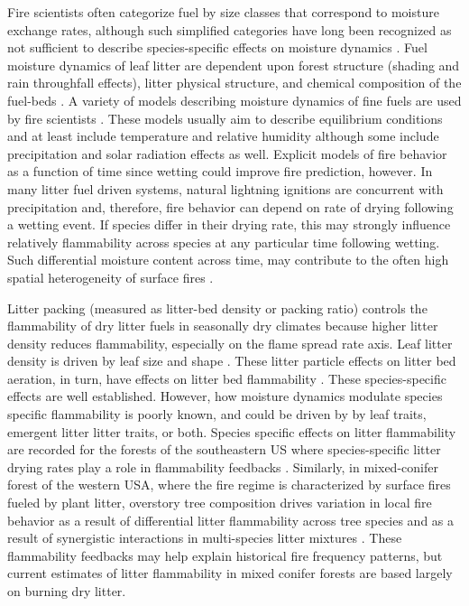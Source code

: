 \documentclass[letterpaper,12pt]{article}
\begin{document}
Fire scientists often categorize fuel by size classes that correspond to
moisture exchange rates, although such simplified categories have long been
recognized as not sufficient to describe species-specific effects on moisture
dynamics \citep{Anderson-1985}. Fuel moisture dynamics of leaf litter are
dependent upon forest structure (shading and rain throughfall effects), litter
physical structure, and chemical composition of the fuel-beds
\citep{Nelson+Hiers-2008, Matthews-2014, Kreye_Hiers_etal-2018}. A variety of
models describing moisture dynamics of fine fuels are used by fire scientists
\citep{Viney-1991, Nelson-2000, Catchpole+Catchpole+etal-2001}. These models
usually aim to describe equilibrium conditions and at least include temperature
and relative humidity although some include precipitation and solar radiation
effects as well. Explicit models of fire behavior as a function of time since
wetting could improve fire prediction, however. In many litter fuel driven
systems, natural lightning ignitions are concurrent with precipitation and,
therefore, fire behavior can depend on rate of drying following a wetting
event. If species differ in their drying rate, this may strongly influence
relatively flammability across species at any particular time following
wetting. Such differential moisture content across time, may contribute to the
often high spatial heterogeneity of surface fires
\citep{Knapp_Schwilk_etal-2006, Kreye_Hiers_etal-2018}.



Litter packing (measured as litter-bed density or packing ratio) controls the
flammability of dry litter fuels in seasonally dry climates because higher
litter density reduces flammability, especially on the flame spread rate axis.
Leaf litter density is driven by leaf size and shape
\citep{Fonda+Belanger+etal-1998, Scarff+Westoby-2006, Kane+Varner+etal-2008}.
These litter particle effects on litter bed aeration, in turn, have effects on
litter bed flammability \citep{Ganteaume+Marielle+etal-2011,
  Schwilk+Caprio-2011, Kreye+Varner+etal-2013}. These species-specific effects
are well established. However, how moisture dynamics modulate species specific
flammability is poorly known, and could be driven by by leaf traits, emergent
litter litter traits, or both. Species specific effects on litter flammability
are recorded for the forests of the southeastern US \citep{Nowacki+Abrams-2008}
where species-specific litter drying rates play a role in flammability
feedbacks \citep{Kreye+Varner+etal-2013}. Similarly, in mixed-conifer forest of
the western USA, where the fire regime is characterized by surface fires fueled
by plant litter, overstory tree composition drives variation in local fire
behavior \citep{Schwilk+Caprio-2011} as a result of differential litter
flammability across tree species and as a result of synergistic interactions in
multi-species litter mixtures \citep{Magalhaes+Schwilk-2012}. These flammability
feedbacks may help explain historical fire frequency patterns, but current
estimates of litter flammability in mixed conifer forests are based largely on
burning dry litter.
\end{document}
